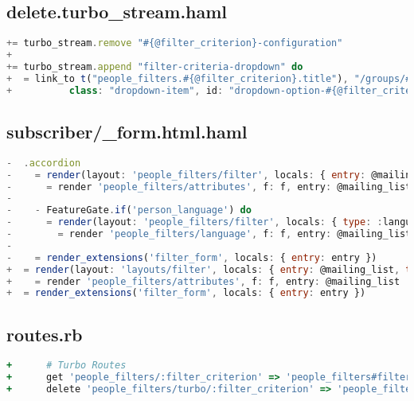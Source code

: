 \subsection{delete.turbo\_stream.haml}
\begin{lstlisting}[language=JavaScript]
+= turbo_stream.remove "#{@filter_criterion}-configuration"
+
+= turbo_stream.append "filter-criteria-dropdown" do
+  = link_to t("people_filters.#{@filter_criterion}.title"), "/groups/#{@group.id}/people_filters/#{@filter_criterion}",
+          class: "dropdown-item", id: "dropdown-option-#{@filter_criterion}", data: {turbo_stream: true}
\end{lstlisting}

\subsection{subscriber/\_form.html.haml}
\begin{lstlisting}[language=JavaScript]
-  .accordion
-    = render(layout: 'people_filters/filter', locals: { entry: @mailing_list, type: :attributes }) do
-      = render 'people_filters/attributes', f: f, entry: @mailing_list
-
-    - FeatureGate.if('person_language') do
-      = render(layout: 'people_filters/filter', locals: { type: :language }) do
-        = render 'people_filters/language', f: f, entry: @mailing_list
-
-    = render_extensions('filter_form', locals: { entry: entry })
+  = render(layout: 'layouts/filter', locals: { entry: @mailing_list, type: :attributes, delete: false}) do
+    = render 'people_filters/attributes', f: f, entry: @mailing_list
+  = render_extensions('filter_form', locals: { entry: entry })
\end{lstlisting}

\subsection{routes.rb}
\begin{lstlisting}[language=Ruby]
+      # Turbo Routes
+      get 'people_filters/:filter_criterion' => 'people_filters#filter_criterion'
+      delete 'people_filters/turbo/:filter_criterion' => 'people_filters#filter_criterion'
\end{lstlisting}

\newpage

